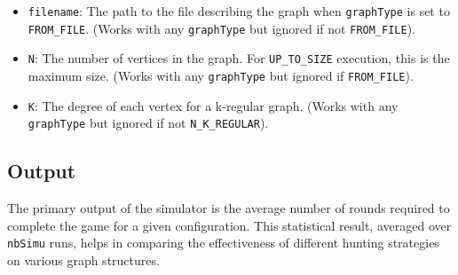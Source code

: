 \documentclass{article}
\begin{document}
\begin{itemize}
    For the \texttt{FROM\_FILE} type, the graph is defined by its adjacency
    matrix in a text file, as shown in this example of a 7-cycle:
    \begin{verbatim}
7
0 1 0 0 0 0 1
1 0 1 0 0 0 0
0 1 0 1 0 0 0
0 0 1 0 1 0 0
0 0 0 1 0 1 0
0 0 0 0 1 0 1
1 0 0 0 0 1 0
    \end{verbatim}
    
    \item \texttt{filename}: The path to the file describing the graph when
    \texttt{graphType} is set to \texttt{FROM\_FILE}. (Works with any
    \texttt{graphType} but ignored if not \texttt{FROM\_FILE}).
    \item \texttt{N}: The number of vertices in the graph. For
    \texttt{UP\_TO\_SIZE} execution, this is the maximum size. (Works with any
    \texttt{graphType} but ignored if \texttt{FROM\_FILE}).
    \item \texttt{K}: The degree of each vertex for a k-regular graph. (Works
    with any \texttt{graphType} but ignored if not \texttt{N\_K\_REGULAR}).
\end{itemize}

\subsection{Output}
The primary output of the simulator is the average number of rounds required to 
complete the game for a given configuration. This statistical result, averaged
over \texttt{nbSimu} runs, helps in comparing the effectiveness of different
hunting strategies on various graph structures.
\end{document}

